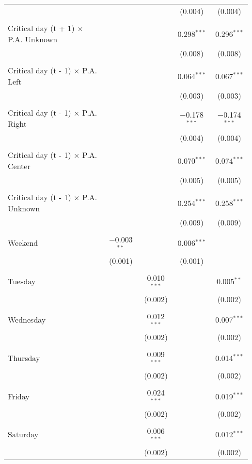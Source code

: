 \documentclass[
]{article}
\begin{document}
\begin{table}[!htbp]
{\begin{tabular}{@{\extracolsep{5pt}}lcccc}
  &  &  & (0.004) & (0.004) \\ 
  & & & & \\ 
 Critical day (t + 1) $\times$ P.A. Unknown &  &  & 0.298$^{***}$ & 0.296$^{***}$ \\ 
  &  &  & (0.008) & (0.008) \\ 
  & & & & \\ 
 Critical day (t - 1) $\times$ P.A. Left &  &  & 0.064$^{***}$ & 0.067$^{***}$ \\ 
  &  &  & (0.003) & (0.003) \\ 
  & & & & \\ 
 Critical day (t - 1) $\times$ P.A. Right &  &  & $-$0.178$^{***}$ & $-$0.174$^{***}$ \\ 
  &  &  & (0.004) & (0.004) \\ 
  & & & & \\ 
 Critical day (t - 1) $\times$ P.A. Center &  &  & 0.070$^{***}$ & 0.074$^{***}$ \\ 
  &  &  & (0.005) & (0.005) \\ 
  & & & & \\ 
 Critical day (t - 1) $\times$ P.A. Unknown &  &  & 0.254$^{***}$ & 0.258$^{***}$ \\ 
  &  &  & (0.009) & (0.009) \\ 
  & & & & \\ 
 Weekend & $-$0.003$^{**}$ &  & 0.006$^{***}$ &  \\ 
  & (0.001) &  & (0.001) &  \\ 
  & & & & \\ 
 Tuesday &  & 0.010$^{***}$ &  & 0.005$^{**}$ \\ 
  &  & (0.002) &  & (0.002) \\ 
  & & & & \\ 
 Wednesday &  & 0.012$^{***}$ &  & 0.007$^{***}$ \\ 
  &  & (0.002) &  & (0.002) \\ 
  & & & & \\ 
 Thursday &  & 0.009$^{***}$ &  & 0.014$^{***}$ \\ 
  &  & (0.002) &  & (0.002) \\ 
  & & & & \\ 
 Friday &  & 0.024$^{***}$ &  & 0.019$^{***}$ \\ 
  &  & (0.002) &  & (0.002) \\ 
  & & & & \\ 
 Saturday &  & 0.006$^{***}$ &  & 0.012$^{***}$ \\ 
  &  & (0.002) &  & (0.002) \\ 

\end{tabular}}
\end{table}
\end{document}
